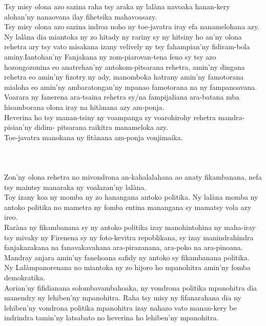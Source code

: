 \documentclass[12pt]{article}
\newcounter{laharana}
\newcommand{\andininy}[0]{
  \paragraph{%
    \NoCaseChange{%
      Andininy~\addtocounter{laharana}{1}\thelaharana.}\label{and:\thelaharana}~%
  }%
}
\begin{document}
\noindent
Tsy misy olona azo sazina raha tsy araka ny lalàna navoaka hanan-kery alohan'ny
nanaovana ilay fihetsika mahavoasazy.\\

\noindent
Tsy misy olona azo sazina indroa noho ny toe-javatra iray efa nanamelohana
azy. Ny lalàna dia miantoka ny zo hitady ny rariny sy ny hitsiny ho an'ny olona
rehetra ary tsy vato misakana izany velively ny tsy fahampian'ny fidiram-bola
aminy.Iantohan'ny Fanjakana ny zom-piarovan-tena feno sy tsy azo hozongozonina
eo anatrehan'ny antokom-pitsarana rehetra, amin'ny dingana rehetra eo amin'ny
fizotry ny ady, manomboka hatrany amin'ny famotorana mialoha eo amin'ny
ambaratongan'ny mpanao famotorana na ny fampanoavana.\\

\noindent
Voarara ny fanerena ara-tsaina rehetra sy/na fampijaliana ara-batana mba
hisamborana olona iray na hitànana azy am-ponja.\\

\noindent
Heverina ho tsy manan-tsiny ny voampanga sy voarohirohy rehetra mandra-pisian'ny
didim- pitsarana raikitra manameloka azy.\\

\noindent
Toe-javatra manokana ny fitànana am-ponja vonjimaika.

\andininy{}Zon'ny olona rehetra no mivondrona an-kahalalahana ao anaty
fikambanana, nefa tsy maintsy manaraka ny voalazan'ny lalàna.\\

\noindent
Toy izany koa ny momba ny zo hanangana antoko politika. Ny lalàna momba ny
antoko politika no mametra ny fomba entina manangana sy mamatsy vola azy ireo.\\

\noindent
Raràna ny fikambanana sy ny antoko politika izay manohintohina ny maha-iray tsy
mivaky ny Firenena sy ny foto-kevitra repoblikana, sy izay manindrahindra
fanjakazakana na fanavakavahana ara-pirazanana, ara-poko na ara-pinoana.\\

\noindent
Mandray anjara amin'ny fanehoana safidy ny antoko sy fikambanana politika.\\

\noindent
Ny Lalàmpanorenana no miantoka ny zo hijoro ho mpanohitra amin'ny fomba
demokratika.\\

\noindent
Aorian'ny fifidianana solombavambahoaka, ny vondrona politika mpanohitra dia
manendry ny lehiben'ny mpanohitra. Raha tsy misy ny fifanarahana dia ny
lehiben'ny vondrona politika mpanohitra izay nahazo vato manan-kery be indrindra
tamin'ny latsabato no heverina ho lehiben'ny mpanohitra.\\
\end{document}
